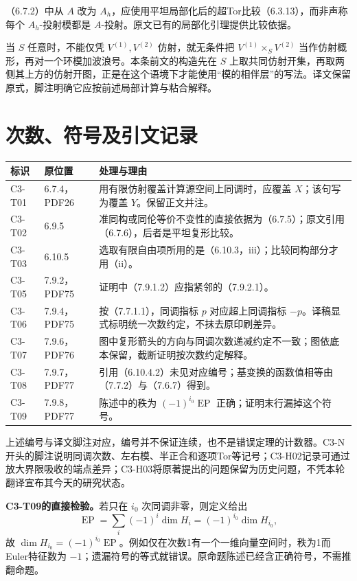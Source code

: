 （6.7.2）中从 $A$ 改为 $A_h$，应使用平坦局部化后的超Tor比较（6.3.13），而非声称每个 $A_h$-投射模都是 $A$-投射。原文已有的局部化引理提供比较依据。

当 $S$ 任意时，不能仅凭 $V^{(1)},V^{(2)}$ 仿射，就无条件把 $V^{(1)}\times_SV^{(2)}$ 当作仿射概形，再对一个环模加波浪号。本条前文的构造先在 $S$ 上取共同仿射开集，再取两侧其上方的仿射开图，正是在这个语境下才能使用“模的相伴层”的写法。译文保留原式，脚注明确它应按前述局部计算与粘合解释。

\section*{次数、符号及引文记录}
\begin{longtable}{@{}p{.17\linewidth}p{.24\linewidth}p{.51\linewidth}@{}}
\toprule 标识 & 原位置 & 处理与理由\\\midrule\endhead
C3-T01 & 6.7.4，PDF26 & 用有限仿射覆盖计算源空间上同调时，应覆盖 $X$；该句写为覆盖 $Y$。保留正文并注。\\
C3-T02 & 6.9.5 & 准同构或同伦等价不变性的直接依据为（6.7.5）；原文引用（6.7.6），后者是平坦复形比较。\\
C3-T03 & 6.10.5 & 选取有限自由项所用的是（6.10.3，iii）；比较同构部分才用（ii）。\\
C3-T05 & 7.9.2，PDF75 & 证明中（7.9.1.2）应指紧邻的（7.9.2.1）。\\
C3-T06 & 7.9.4，PDF75 & 按（7.7.1.1），同调指标 $p$ 对应超上同调指标 $-p$。译稿显式标明统一次数约定，不抹去原印刷差异。\\
C3-T07 & 7.9.6，PDF76 & 图中复形箭头的方向与同调次数递减约定不一致；图依底本保留，截断证明按次数约定解释。\\
C3-T08 & 7.9.7，PDF77 & 引用（6.10.4.2）未见对应编号；基变换的函数值相等由（7.7.2）与（7.6.7）得到。\\
C3-T09 & 7.9.8，PDF77 & 陈述中的秩为 $(-1)^{i_0}\operatorname{EP}$ 正确；证明末行漏掉这个符号。\\
\bottomrule
\end{longtable}
上述编号与译文脚注对应，编号并不保证连续，也不是错误定理的计数器。C3-N开头的脚注说明同调次数、左右模、半正合和逐项Tor等记号；C3-H02记录可通过放大界限吸收的端点差异；C3-H03将原著提出的问题保留为历史问题，不凭本轮翻译宣布其今天的研究状态。

\textbf{C3-T09的直接检验。}若只在 $i_0$ 次同调非零，则定义给出
\[
 \operatorname{EP}=\sum_i(-1)^i\dim H_i=(-1)^{i_0}\dim H_{i_0},
\]
故 $\dim H_{i_0}=(-1)^{i_0}\operatorname{EP}$。例如仅在次数1有一个一维向量空间时，秩为1而Euler特征数为 $-1$；遗漏符号的等式就错误。原命题陈述已经含正确符号，不需推翻命题。

